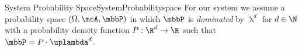 \begin{mdef}{System Probability Space}{SystemProbabilityspace}
    For our system we assume a probability space $(\Omega,\mcA,\mbbP)$ in which $\mbbP$ is \emph{dominated} by $\uplambda^d$ for $d\in\N$ with a probability density function $P:\R^d\to\R$ such that $\mbbP = P\cdot\uplambda^d$.
\end{mdef}